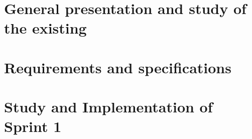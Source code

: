 \documentclass{polypfe}
\begin{document}

\tableofcontents

\newpage

\listoffigures

\newpage

\listoftables

\newpage



\newpage






\chapter{General presentation and study of the existing}
\clearpage








\chapter{Requirements and specifications}
\clearpage





%
%


\chapter{Study and Implementation of Sprint 1}
\clearpage







\end{document}
